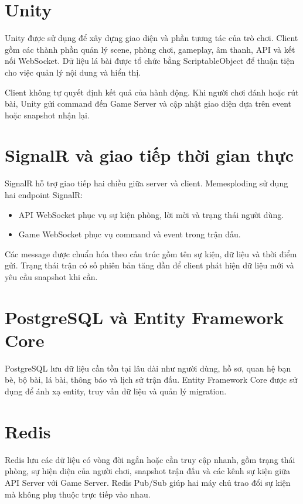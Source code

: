 \documentclass[a4paper]{report}
\begin{document}
\section{Unity}

Unity được sử dụng để xây dựng giao diện và phần tương tác của trò chơi. Client
gồm các thành phần quản lý scene, phòng chơi, gameplay, âm thanh, API và kết nối
WebSocket. Dữ liệu lá bài được tổ chức bằng ScriptableObject để thuận tiện cho
việc quản lý nội dung và hiển thị.

Client không tự quyết định kết quả của hành động. Khi người chơi đánh hoặc rút
bài, Unity gửi command đến Game Server và cập nhật giao diện dựa trên event hoặc
snapshot nhận lại.

\section{SignalR và giao tiếp thời gian thực}

SignalR hỗ trợ giao tiếp hai chiều giữa server và client. Memesploding sử dụng
hai endpoint SignalR:

\begin{itemize}
    \item API WebSocket phục vụ sự kiện phòng, lời mời và trạng thái người dùng.
    \item Game WebSocket phục vụ command và event trong trận đấu.
\end{itemize}

Các message được chuẩn hóa theo cấu trúc gồm tên sự kiện, dữ liệu và thời điểm
gửi. Trạng thái trận có số phiên bản tăng dần để client phát hiện dữ liệu mới và
yêu cầu snapshot khi cần.

\section{PostgreSQL và Entity Framework Core}

PostgreSQL lưu dữ liệu cần tồn tại lâu dài như người dùng, hồ sơ, quan hệ bạn bè,
bộ bài, lá bài, thông báo và lịch sử trận đấu. Entity Framework Core được sử dụng
để ánh xạ entity, truy vấn dữ liệu và quản lý migration.

\section{Redis}

Redis lưu các dữ liệu có vòng đời ngắn hoặc cần truy cập nhanh, gồm trạng thái
phòng, sự hiện diện của người chơi, snapshot trận đấu và các kênh sự kiện giữa
API Server với Game Server. Redis Pub/Sub giúp hai máy chủ trao đổi sự kiện mà
không phụ thuộc trực tiếp vào nhau.
\end{document}
